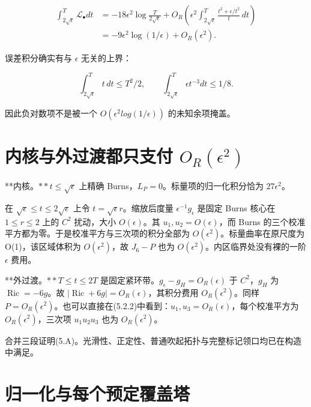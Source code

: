 \documentclass[UTF8,11pt,fontset=none]{ctexart}
\theoremstyle{definition}
\theoremstyle{remark}
\begin{document}
\[
\begin{aligned}
\int_{2\sqrt\epsilon}^{T}\mathscr L_\bullet dt
&=-18\epsilon^2\log\frac{T}{2\sqrt\epsilon}
 +O_R\left(\epsilon^2\int_{2\sqrt\epsilon}^{T}
 \frac{t^2+\epsilon/t^2}{t}\,dt\right)\\
&=-9\epsilon^2\log(1/\epsilon)+O_R(\epsilon^2).
\end{aligned}
\]

误差积分确实有与 \(\epsilon\) 无关的上界：

\[
\int_{2\sqrt\epsilon}^{T}t\,dt\le T^2/2,\qquad
\int_{2\sqrt\epsilon}^{T}\epsilon t^{-3}dt\le1/8.
\]

因此负对数项不是被一个 \(O(\epsilon ^2log(1/\epsilon ))\) 的未知余项掩盖。

\section{\texorpdfstring{内核与外过渡都只支付 \(O_R(\epsilon ^2)\)}{内核与外过渡都只支付 O\_R(\textbackslash epsilon \^{}2)}}\label{v5-ux5185ux6838ux4e0eux5916ux8fc7ux6e21ux90fdux53eaux652fux4ed8-o_repsilon-2}

**内核。\(** t\le \sqrt{\epsilon }\) 上精确 Burns，\(L_P=0\)。标量项的归一化积分恰为 \(27\epsilon ^2\)。

在 \(\sqrt{\epsilon }\le t\le 2\sqrt{\epsilon }\) 上令 \(t=\sqrt{\epsilon  }r\)。缩放后度量 \(\epsilon ^{-1}g_\epsilon\) 是固定 Burns 核心在 \(1\le r\le 2\) 上的 \(C^2\) 扰动，大小 \(O(\epsilon )\)。其 \(u_1,u_2=O(\epsilon )\)，而 Burns 的三个校准平方都为零。于是校准平方与三次项的积分全部为 \(O(\epsilon ^2)\)。标量曲率在原尺度为 O(1)，该区域体积为 \(O(\epsilon ^2)\)，故 \(J_6-P\) 也为 \(O(\epsilon ^2)\)。内区临界处没有裸的一阶 \(\epsilon\) 费用。

**外过渡。\(** T\le t\le 2T\) 是固定紧环带。\(g_\epsilon -g_H=O_R(\epsilon )\) 于 \(C^2\)，\(g_H\) 为 \(\operatorname{Ric}=-6g\)。故 \(|\operatorname{Ric}+6g|=O_R(\epsilon )\)，其积分费用 \(O_R(\epsilon ^2)\)。同样 \(P=O_R(\epsilon ^2)\)。也可以直接在(5.2.2)中看到：\(u_1,u_3=O_R(\epsilon )\)，每个校准平方为 \(O_R(\epsilon ^2)\)，三次项 \(u_1u_2u_3\) 也为 \(O_R(\epsilon ^2)\)。

合并三段证明(5.A)。光滑性、正定性、普通吹起拓扑与完整标记领口均已在构造中满足。

\section{归一化与每个预定覆盖塔}\label{v5-ux5f52ux4e00ux5316ux4e0eux6bcfux4e2aux9884ux5b9aux8986ux76d6ux5854}
\end{document}
